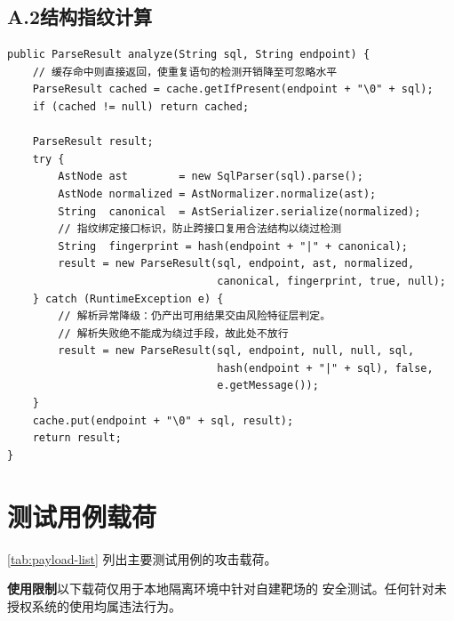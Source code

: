 \subsection*{A.2\quad 结构指纹计算}

\begin{lstlisting}[style=javastyle, caption={结构指纹的计算流程}]
public ParseResult analyze(String sql, String endpoint) {
    // 缓存命中则直接返回，使重复语句的检测开销降至可忽略水平
    ParseResult cached = cache.getIfPresent(endpoint + "\0" + sql);
    if (cached != null) return cached;

    ParseResult result;
    try {
        AstNode ast        = new SqlParser(sql).parse();
        AstNode normalized = AstNormalizer.normalize(ast);
        String  canonical  = AstSerializer.serialize(normalized);
        // 指纹绑定接口标识，防止跨接口复用合法结构以绕过检测
        String  fingerprint = hash(endpoint + "|" + canonical);
        result = new ParseResult(sql, endpoint, ast, normalized,
                                 canonical, fingerprint, true, null);
    } catch (RuntimeException e) {
        // 解析异常降级：仍产出可用结果交由风险特征层判定。
        // 解析失败绝不能成为绕过手段，故此处不放行
        result = new ParseResult(sql, endpoint, null, null, sql,
                                 hash(endpoint + "|" + sql), false,
                                 e.getMessage());
    }
    cache.put(endpoint + "\0" + sql, result);
    return result;
}
\end{lstlisting}

\section{测试用例载荷}
\setcounter{table}{0}

\cref{tab:payload-list} 列出主要测试用例的攻击载荷。

\begin{warnbox}
\textbf{使用限制}\quad 以下载荷仅用于本地隔离环境中针对自建靶场的
安全测试。任何针对未授权系统的使用均属违法行为。
\end{warnbox}

